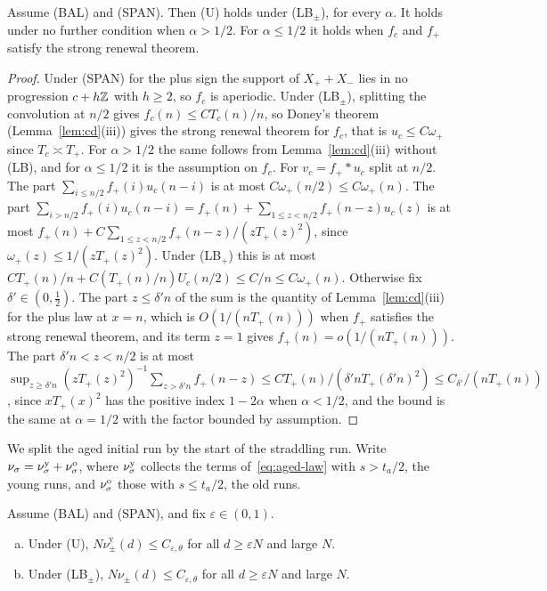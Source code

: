 \begin{lemma}\label{lem:U}
Assume (BAL) and (SPAN). Then (U) holds under (LB$_\pm$), for every $\alpha$. It holds under
no further condition when $\alpha>1/2$. For $\alpha\le1/2$ it holds when $f_c$ and $f_\plus$
satisfy the strong renewal theorem.
\end{lemma}

\begin{proof}
Under (SPAN) for the plus sign the support of $X_\plus+X_\minus$ lies in no progression
$c+h\mathbb{Z}$ with $h\ge2$, so $f_c$ is aperiodic. Under (LB$_\pm$), splitting the convolution at
$n/2$ gives $f_c(n)\le CT_c(n)/n$, so Doney's theorem (Lemma~\ref{lem:cd}(iii)) gives the strong
renewal theorem for $f_c$, that is $u_c\le C\omega_\plus$ since $T_c\asymp T_\plus$. For
$\alpha>1/2$ the same follows from Lemma~\ref{lem:cd}(iii) without (LB), and for $\alpha\le1/2$
it is the assumption on $f_c$. For $v_c=f_\plus*u_c$ split at $n/2$. The part
$\sum_{i\le n/2}f_\plus(i)u_c(n-i)$ is at most $C\omega_\plus(n/2)\le C\omega_\plus(n)$. The part
$\sum_{i>n/2}f_\plus(i)u_c(n-i)=f_\plus(n)+\sum_{1\le z<n/2}f_\plus(n-z)u_c(z)$ is at most
$f_\plus(n)+C\sum_{1\le z<n/2}f_\plus(n-z)/(zT_\plus(z)^2)$, since $\omega_\plus(z)\le1/(zT_\plus(z)^2)$.
Under (LB$_\plus$) this is at most $CT_\plus(n)/n+C(T_\plus(n)/n)U_c(n/2)\le C/n\le C\omega_\plus(n)$.
Otherwise fix $\delta'\in(0,\frac12)$. The part $z\le\delta'n$ of the sum is the quantity of
Lemma~\ref{lem:cd}(iii) for the plus law at $x=n$, which is $O(1/(nT_\plus(n)))$ when $f_\plus$
satisfies the strong renewal theorem, and its term $z=1$ gives $f_\plus(n)=o(1/(nT_\plus(n)))$. The
part $\delta'n<z<n/2$ is at most $\sup_{z\ge\delta'n}(zT_\plus(z)^2)^{-1}\sum_{z>\delta'n}f_\plus(n-z)\le CT_\plus(n)/(\delta'nT_\plus(\delta'n)^2)\le C_{\delta'}/(nT_\plus(n))$,
since $xT_\plus(x)^2$ has the positive index $1-2\alpha$ when $\alpha<1/2$, and the bound is the
same at $\alpha=1/2$ with the factor bounded by assumption.
\end{proof}

We split the aged initial run by the start of the straddling run. Write
$\nu_\sigma=\nu^{\mathrm y}_\sigma+\nu^{\mathrm o}_\sigma$, where $\nu^{\mathrm y}_\sigma$ collects the
terms of~\eqref{eq:aged-law} with $s>t_a/2$, the young runs, and $\nu^{\mathrm o}_\sigma$ those
with $s\le t_a/2$, the old runs.

\begin{lemma}\label{lem:aged-pointwise}
Assume (BAL) and (SPAN), and fix $\varepsilon\in(0,1)$.
\begin{enumerate}[(a)]
\item Under (U), $N\nu^{\mathrm y}_\pm(d)\le C_{\varepsilon,\theta}$ for all $d\ge\varepsilon N$ and large $N$.
\item Under (LB$_\pm$), $N\nu_\pm(d)\le C_{\varepsilon,\theta}$ for all $d\ge\varepsilon N$ and large $N$.
\end{enumerate}
\end{lemma}

